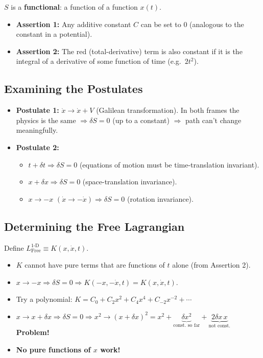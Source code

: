$S$ is a \textbf{functional}: a function of a function $x(t)$.

\begin{itemize}
    \item \textbf{Assertion 1:} Any additive constant $C$ can be set to 0 (analogous
        to the constant in a potential).
    \item \textbf{Assertion 2:} The red (total-derivative) term is also constant if it
        is the integral of a derivative of some function of time (e.g.\ $2t^2$).
\end{itemize}

\subsection{Examining the Postulates}

\begin{itemize}
    \item \textbf{Postulate 1:} $\dot{x} \to \dot{x} + V$ (Galilean transformation).
        In both frames the physics is the same $\Rightarrow \delta S = 0$ (up to a
        constant) $\Rightarrow$ path can't change meaningfully.
    \item \textbf{Postulate 2:}
        \begin{itemize}
            \item $t + \delta t \Rightarrow \delta S = 0$ (equations of motion must be
                time-translation invariant).
            \item $x + \delta x \Rightarrow \delta S = 0$ (space-translation invariance).
            \item $x \to -x$ $(\dot{x} \to -\dot{x}) \Rightarrow \delta S = 0$
                (rotation invariance).
        \end{itemize}
\end{itemize}

\subsection{Determining the Free Lagrangian}

Define $L_\mathrm{Free}^{1\text{-D}} \equiv K(x, \dot{x}, t)$.

\begin{itemize}
    \item $K$ cannot have pure terms that are functions of $t$ alone (from Assertion 2).
    \item $x \to -x \Rightarrow \delta S = 0 \Rightarrow K(-x, -\dot{x}, t) = K(x, \dot{x}, t)$.
    \item Try a polynomial: $K = C_0 + C_2 x^2 + C_4 x^4 + C_{-2}x^{-2} + \cdots$
    \item $x \to x + \delta x \Rightarrow \delta S = 0 \Rightarrow x^2 \to (x+\delta x)^2
        = x^2 + \underbrace{\delta x^2}_{\text{const. so far}} + \underbrace{2\delta x\, x}_{\text{not const.}}$
        \textbf{Problem!}
    \item \textbf{No pure functions of $x$ work!}
\end{itemize}

